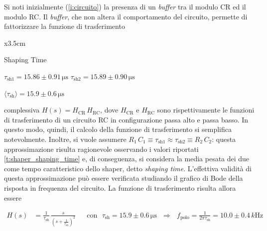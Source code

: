 \documentclass[a4paper,11pt]{article} %
\begin{document}
Si noti inizialmente (\autoref{i:circuito}) la presenza di un \textit{buffer} tra il modulo CR ed il modulo RC. Il \textit{buffer}, che non
altera il comportamento del circuito, permette di fattorizzare la funzione di trasferimento

\begin{table}
	\small
	\centering
	\begin{tabular}{x{3.5cm}} 
		\toprule[0.5px]
		\toprule[0.1px]	
		
		Shaping Time \tn

		\midrule[0.1px]
		
		\addlinespace

		$\tau_{\text{sh}1} = 15.86 \pm 0.91 \,\si{\us}$ \tn
		$\tau_{\text{sh}2} = 15.89 \pm 0.90 \,\si{\us}$ \tn

		\addlinespace

		$\langle\tau_{\text{sh}}\rangle = 15.9 \pm 0.6 \,\si{\us}$ \tn


		\bottomrule[0.5px]		
	\end{tabular}
	\caption{\small Stime di $\tau^{\text{sh}}$.}
	\label{t:shaper_shaping_time}
\end{table}	

 complessiva $H(s) = H_{\text{CR}} \, H_{\text{RC}}$, dove $H_{\text{CR}}$ e
$H_{\text{RC}}$ sono rispettivamente le funzioni di trasferimento di un circuito RC in configurazione passa alto e passa
basso. In questo modo, quindi, il calcolo della funzione di trasferimento si semplifica notevolmente. Inoltre, si vuole
assumere $R_1 \, C_1 \equiv \tau_{\text{sh}1} \approx \tau_{\text{sh2}} \equiv R_2 \, C_2$: questa approssimazione
risulta ragionevole osservando i valori riportati \autoref{t:shaper_shaping_time} e, di conseguenza, si considera la
media pesata dei due come tempo caratteristico dello shaper, detto \textit{shaping time}. L'effettiva validità di questa
approssimazione può essere verificata studiando il grafico di Bode della risposta in frequenza del circuito. La funzione
di trasferimento risulta allora essere

\begin{align}\label{e:shaper_H} 
	H(s) &= \frac{ 1 }{ \tau_{\text{sh} } }  \,  
	\frac{ s }{ \left( s + \frac{ 1 }{ \tau_{\text{sh} } } \right)^2}  
   	& 
   	&\text{con} \,\,\,\, \tau_{\text{sh}}= 15.9 \pm 0.6 \,\si{\us} 
   	\,\,\,\,\Longrightarrow\,\,\,\,
   	f_{\text{polo}}=\frac{1}{2\pi \tau_{\text{sh}}}= 10.0 \pm 0.4 \,\si{k\Hz}
\end{align}
\end{document}
